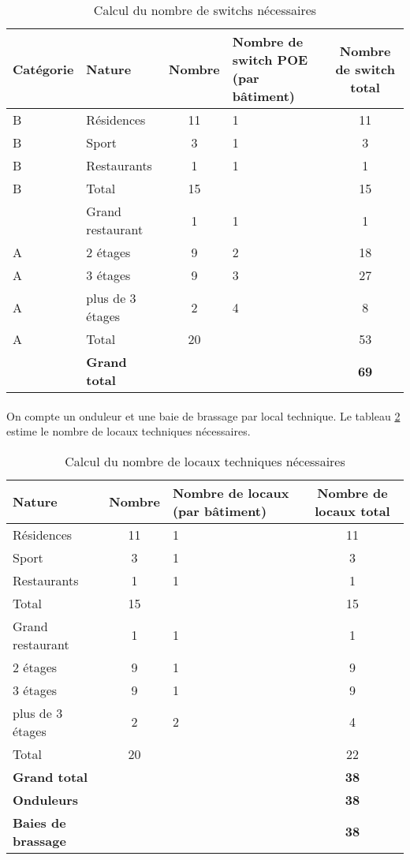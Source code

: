 \begin{table}[p]
  \caption{\label{table_switchs} Calcul du nombre de switchs nécessaires}
  \begin{tabular}{|l|l|c|m{4cm}|c|}
    \hline
    Catégorie & Nature & Nombre & Nombre de switch \ac{POE} (par bâtiment) & Nombre
    de switch total \\
    \hline
    B & Résidences  & 11 & 1 & 11 \\
    B & Sport       & 3  & 1 & 3  \\
    B & Restaurants & 1  & 1 & 1  \\
    \hline
    B & Total       & 15 &       & 15 \\
    \hline
      & Grand restaurant & 1 & 1 & 1 \\
    \hline
    A & 2 étages         & 9 & 2 & 18 \\
    A & 3 étages         & 9 & 3 & 27 \\
    A & plus de 3 étages & 2 & 4 & 8 \\
    \hline
    A & Total            & 20 &  & 53 \\
    \hline
    \hline
      & \bf{Grand total} & & & \bf{69} \\
    \hline
  \end{tabular}
\end{table}

\paragraph{} On compte un onduleur et une baie de brassage par local technique. Le tableau
\ref{table_locaux} estime le nombre de locaux techniques nécessaires.

\begin{table}[p]
  \caption{\label{table_locaux} Calcul du nombre de locaux techniques nécessaires}
  \begin{tabular}{|l|c|m{4cm}|c|}
    \hline
    Nature & Nombre & Nombre de locaux (par bâtiment) & Nombre de locaux total \\
    \hline
    Résidences  & 11 & 1 & 11 \\
    Sport       & 3  & 1 & 3 \\
    Restaurants & 1  & 1 & 1 \\
    \hline
    Total       & 15 &   & 15 \\
    \hline
    Grand restaurant & 1 & 1 & 1 \\
    \hline
    2 étages         & 9 & 1 & 9 \\
    3 étages         & 9 & 1 & 9 \\
    plus de 3 étages & 2 & 2 & 4 \\
    \hline
    Total            & 20 & & 22 \\
    \hline
    \hline
    \bf{Grand total} & & & \bf{38} \\
    \bf{Onduleurs} & & & \bf{38} \\
    \bf{Baies de brassage} & & & \bf{38} \\
    \hline
  \end{tabular}
\end{table}

